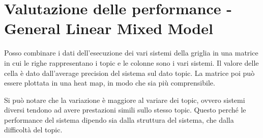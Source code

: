 \section{Valutazione delle performance - General Linear Mixed Model}

Posso combinare i dati dell'esecuzione dei vari sistemi della griglia in una matrice in cui le righe rappresentano i topic e le colonne sono i vari sistemi. Il valore delle cella è dato dall'average precision del sistema sul dato topic.
La matrice poi può essere plottata in una heat map, in modo che sia più comprensibile.


Si può notare che la variazione è maggiore al variare dei topic, ovvero sistemi diversi tendono ad avere prestazioni simili sullo stesso topic.
Questo perché le performance del sistema dipendo sia dalla struttura del sistema, che dalla difficoltà del topic.

















